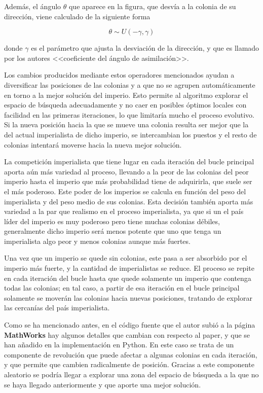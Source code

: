 Además, el ángulo $\theta$ que aparece en la figura, que desvía a la colonia de su dirección, viene calculado de la siguiente forma

\begin{equation}\label{ica-eq-desplazamiento2}
	\theta \sim U(-\gamma, \gamma)
\end{equation}

donde $\gamma$ es el parámetro que ajusta la desviación de la dirección, y que es llamado por los autores <<coeficiente del ángulo de asimilación>>.

Los cambios producidos mediante estos operadores mencionados ayudan a diversificar las posiciones de las colonias y a que no se agrupen automáticamente en torno a la mejor solución del imperio. Esto permite al algoritmo explorar el espacio de búsqueda adecuadamente y no caer en posibles óptimos locales con facilidad en las primeras iteraciones, lo que limitaría mucho el proceso evolutivo. Si la nueva posición hacia la que se mueve una colonia resulta ser mejor que la del actual imperialista de dicho imperio, se intercambian los puestos y el resto de colonias intentará moverse hacia la nueva mejor solución.

La competición imperialista que tiene lugar en cada iteración del bucle principal aporta aún más variedad al proceso, llevando a la peor de las colonias del peor imperio hasta el imperio que más probabilidad tiene de adquirirla, que suele ser el más poderoso. Este poder de los imperios se calcula en función del peso del imperialista y del peso medio de sus colonias. Esta decisión también aporta más variedad a la par que realismo en el proceso imperialista, ya que si un el país líder del imperio es muy poderoso pero tiene muchas colonias débiles, generalmente dicho imperio será menos potente que uno que tenga un imperialista algo peor y menos colonias aunque más fuertes.

Una vez que un imperio se quede sin colonias, este pasa a ser absorbido por el imperio más fuerte, y la cantidad de imperialistas se reduce. El proceso se repite en cada iteración del bucle hasta que quede solamente un imperio que contenga todas las colonias; en tal caso, a partir de esa iteración en el bucle principal solamente se moverán las colonias hacia nuevas posiciones, tratando de explorar las cercanías del país imperialista.

Como se ha mencionado antes, en el código fuente que el autor subió a la página \textbf{MathWorks} \cite{ica-matlab} hay algunos detalles que cambian con respecto al paper, y que se han añadido en la implementación en Python. En este caso se trata de un componente de revolución que puede afectar a algunas colonias en cada iteración, y que permite que cambien radicalmente de posición. Gracias a este componente aleatorio se podría llegar a explorar una zona del espacio de búsqueda a la que no se haya llegado anteriormente y que aporte una mejor solución.

